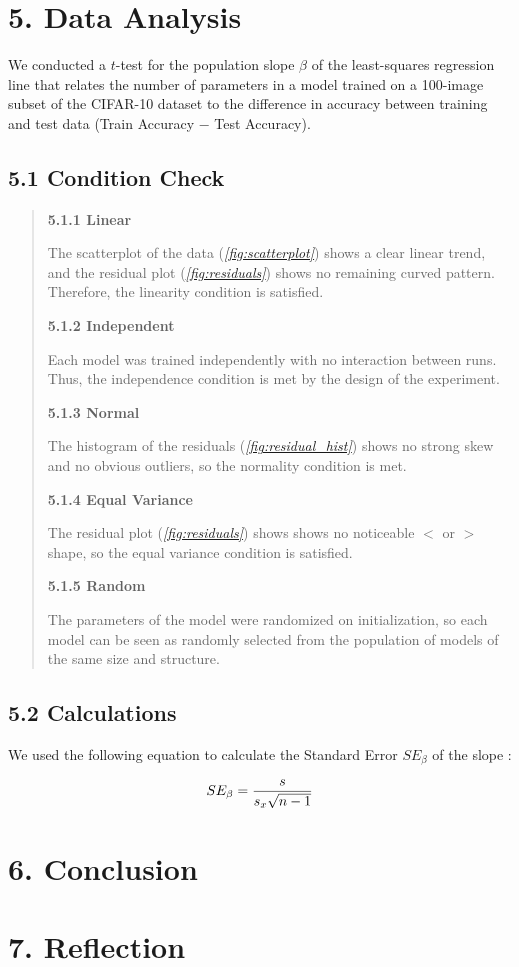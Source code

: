 \documentclass[12pt]{article}
\begin{document}
    \section*{5. Data Analysis}

    We conducted a $t$-test for the population slope $\beta$ of the least-squares regression line that relates the number of parameters in a model trained on a 100-image subset of the CIFAR-10 dataset to the difference in accuracy between training and test data (Train Accuracy $-$ Test Accuracy).

    \subsection*{5.1 Condition Check}

    \begin{quote}

    \textbf{5.1.1 Linear}

    The scatterplot of the data (\textit{\autoref{fig:scatterplot}}) shows a clear linear trend, and the residual plot (\textit{\autoref{fig:residuals}}) shows no remaining curved pattern.
    Therefore, the linearity condition is satisfied.

    \textbf{5.1.2 Independent}

    Each model was trained independently with no interaction between runs. Thus, the independence condition is met by the design of the experiment.

    \textbf{5.1.3 Normal}

    The histogram of the residuals (\textit{\autoref{fig:residual_hist}}) shows no strong skew and no obvious outliers,
    so the normality condition is met.

    \textbf{5.1.4 Equal Variance}

    The residual plot (\textit{\autoref{fig:residuals}}) shows shows no noticeable $<$ or $>$ shape, so the equal variance condition is satisfied.

    \textbf{5.1.5 Random}

    The parameters of the model were randomized on initialization, so each model can be seen as randomly selected from the population
    of models of the same size and structure.

    \end{quote}

    \subsection*{5.2 Calculations}

    We used the following equation to calculate the Standard Error $SE_\beta$ of the slope \beta:

    \begin{equation*}
        \centering
        SE_\beta = \frac{s}{s_x\sqrt{n - 1}}
    \end{equation*}

    \section*{6. Conclusion}

    \section*{7. Reflection}
\end{document}
